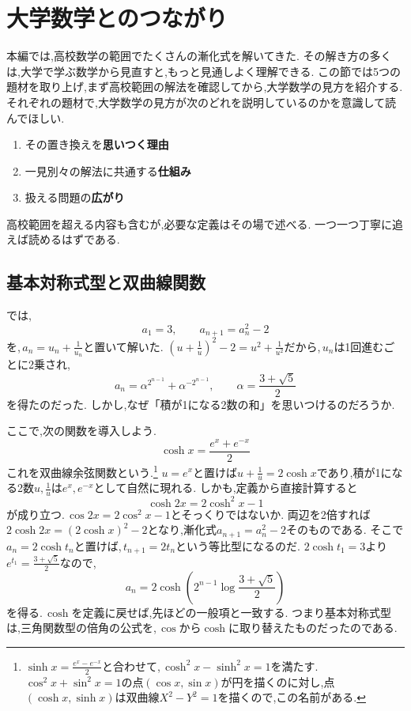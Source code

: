 
\section{大学数学とのつながり}\label{節：大学数学とのつながり}

本編では,高校数学の範囲でたくさんの漸化式を解いてきた.
その解き方の多くは,大学で学ぶ数学から見直すと,もっと見通しよく理解できる.
この節では5つの題材を取り上げ,まず高校範囲の解法を確認してから,大学数学の見方を紹介する.
それぞれの題材で,大学数学の見方が次のどれを説明しているのかを意識して読んでほしい.
\begin{enumerate}
  \item その置き換えを\textbf{思いつく理由}
  \item 一見別々の解法に共通する\textbf{仕組み}
  \item 扱える問題の\textbf{広がり}
\end{enumerate}
高校範囲を超える内容も含むが,必要な定義はその場で述べる.
一つ一つ丁寧に追えば読めるはずである.

\subsection{基本対称式型と双曲線関数}\label{節：基本対称式型と双曲線関数}

では,
\[
  a_1=3,\qquad a_{n+1}=a_n^2-2
\]
を,\,$a_n=u_n+\frac{1}{u_n}$と置いて解いた.
$\left(u+\frac1u\right)^2-2=u^2+\frac{1}{u^2}$だから,\,$u_n$は1回進むごとに2乗され,
\[
  a_n=\alpha^{2^{n-1}}+\alpha^{-2^{n-1}},\qquad \alpha=\frac{3+\sqrt5}{2}
\]
を得たのだった.
しかし,なぜ「積が1になる2数の和」を思いつけるのだろうか.

ここで,次の関数を導入しよう.
\[
  \cosh x=\frac{e^x+e^{-x}}{2}
\]
これを双曲線余弦関数という.\footnote{$\sinh x=\frac{e^x-e^{-x}}{2}$と合わせて,\,$\cosh^2x-\sinh^2x=1$を満たす.\,$\cos^2x+\sin^2x=1$の点$(\cos x,\sin x)$が円を描くのに対し,点$(\cosh x,\sinh x)$は双曲線$X^2-Y^2=1$を描くので,この名前がある.}
$u=e^x$と置けば$u+\frac1u=2\cosh x$であり,積が1になる2数$u,\frac1u$は$e^x,e^{-x}$として自然に現れる.
しかも,定義から直接計算すると
\[
  \cosh2x=2\cosh^2x-1
\]
が成り立つ.\,$\cos2x=2\cos^2x-1$とそっくりではないか.
両辺を2倍すれば$2\cosh2x=(2\cosh x)^2-2$となり,漸化式$a_{n+1}=a_n^2-2$そのものである.
そこで$a_n=2\cosh t_n$と置けば,\,$t_{n+1}=2t_n$という等比型になるのだ.
$2\cosh t_1=3$より$e^{t_1}=\frac{3+\sqrt5}{2}$なので,
\[
  a_n=2\cosh\left(2^{n-1}\log\frac{3+\sqrt5}{2}\right)
\]
を得る.\,$\cosh$を定義に戻せば,先ほどの一般項と一致する.
つまり基本対称式型は,三角関数型の倍角の公式を,\,$\cos$から$\cosh$に取り替えたものだったのである.

